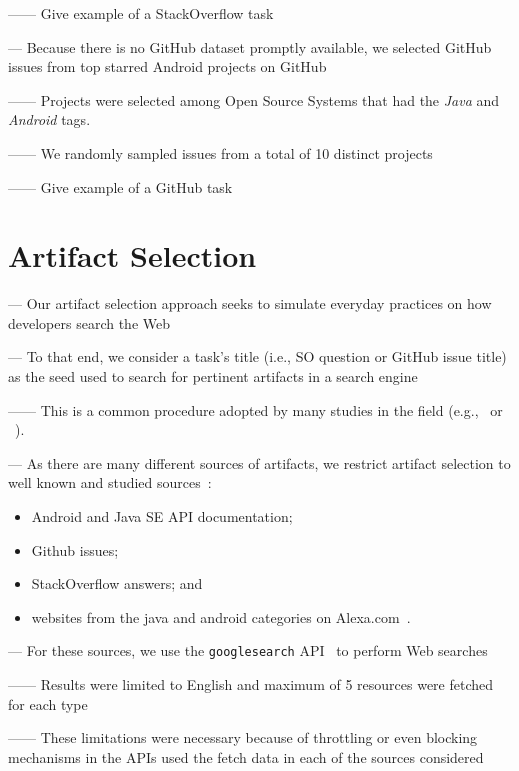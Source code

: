 ------ Give example of a StackOverflow task 


\clearpage

--- Because there is no GitHub dataset promptly available, we selected GitHub issues from top starred Android projects on GitHub 

------ Projects were selected among Open Source Systems that had the \textit{Java} and \textit{Android} tags. 

------ We randomly sampled issues from a total of 10 distinct projects

------ Give example of a GitHub task 

\section{Artifact Selection}


--- Our artifact selection approach seeks to simulate everyday practices on how developers search the Web~\cite{rao2020, Xia2017} \vspace{3mm}

--- To that end, we consider a task's title (i.e., SO question or GitHub issue title) as the seed used to search for pertinent artifacts in a search engine

------ This is a common procedure adopted by many studies in the field (e.g.,~\cite{Xu2017} or ~\cite{Silva2019}). \vspace{3mm}


--- As there are many different sources of artifacts, we restrict artifact selection to well known and studied sources~\cite{Starke2009,Kevic2014, Li2013}:


\begin{itemize}
    \item Android and Java SE API documentation;
    \item Github issues;
    \item StackOverflow answers; and
    \item websites from the java and android categories on Alexa.com~\cite{alexa}.
\end{itemize}


\vspace{3mm}

--- For these sources, we use the \texttt{googlesearch} API~\cite{googlesearch} to perform Web searches

------ Results were limited to English and maximum of 5 resources were fetched for each type

------ These limitations were necessary because of throttling or even blocking mechanisms in the APIs used the fetch data in each of the sources considered \vspace{3mm}

